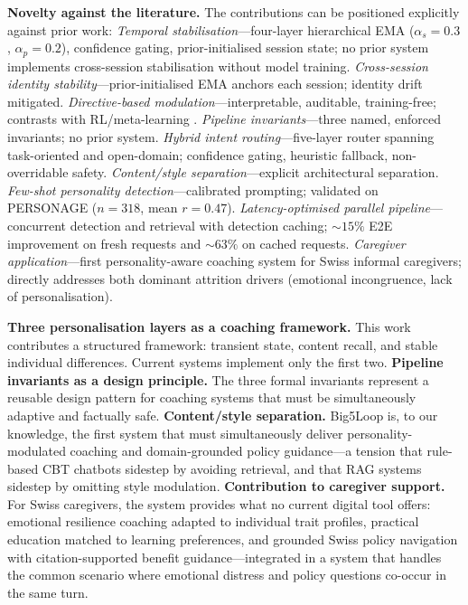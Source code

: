 \documentclass[10pt,a4paper]{report}
\begin{document}
\textbf{Novelty against the literature.} The contributions can be positioned explicitly against prior work: \emph{Temporal stabilisation}---four-layer hierarchical EMA ($\alpha_s = 0.3$, $\alpha_p = 0.2$), confidence gating, prior-initialised session state; no prior system implements cross-session stabilisation without model training. \emph{Cross-session identity stability}---prior-initialised EMA anchors each session; identity drift \citep{Kovac2024} mitigated. \emph{Directive-based modulation}---interpretable, auditable, training-free; contrasts with RL/meta-learning \citep{denHengst2019, Lin2019, Shea2023}. \emph{Pipeline invariants}---three named, enforced invariants; no prior system. \emph{Hybrid intent routing}---five-layer router spanning task-oriented and open-domain; confidence gating, heuristic fallback, non-overridable safety. \emph{Content/style separation}---explicit architectural separation. \emph{Few-shot personality detection}---calibrated prompting; validated on PERSONAGE ($n = 318$, mean $r = 0.47$). \emph{Latency-optimised parallel pipeline}---concurrent detection and retrieval with detection caching; ${\sim}15\%$ E2E improvement on fresh requests and ${\sim}63\%$ on cached requests. \emph{Caregiver application}---first personality-aware coaching system for Swiss informal caregivers; directly addresses both dominant attrition drivers (emotional incongruence, lack of personalisation).

\textbf{Three personalisation layers as a coaching framework.} This work contributes a structured framework: transient state, content recall, and stable individual differences. Current systems implement only the first two. \textbf{Pipeline invariants as a design principle.} The three formal invariants represent a reusable design pattern for coaching systems that must be simultaneously adaptive and factually safe. \textbf{Content/style separation.} Big5Loop is, to our knowledge, the first system that must simultaneously deliver personality-modulated coaching and domain-grounded policy guidance---a tension that rule-based CBT chatbots sidestep by avoiding retrieval, and that RAG systems sidestep by omitting style modulation. \textbf{Contribution to caregiver support.} For Swiss caregivers, the system provides what no current digital tool offers: emotional resilience coaching adapted to individual trait profiles, practical education matched to learning preferences, and grounded Swiss policy navigation with citation-supported benefit guidance---integrated in a system that handles the common scenario where emotional distress and policy questions co-occur in the same turn.
\end{document}
